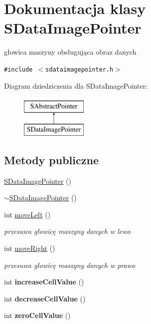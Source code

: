 \hypertarget{classSDataImagePointer}{
\section{Dokumentacja klasy SDataImagePointer}
\label{classSDataImagePointer}
}
głowica maszyny obsługująca obraz danych  


{\tt \#include $<$sdataimagepointer.h$>$}

Diagram dziedziczenia dla SDataImagePointer:\begin{figure}[H]
\begin{center}
\leavevmode
\includegraphics[height=2cm]{classSDataImagePointer}
\end{center}
\end{figure}
\subsection*{Metody publiczne}
\begin{CompactItemize}
\item 
\hyperlink{classSDataImagePointer_2ffb42e886f442004cd21617a6ea034d}{SDataImagePointer} ()
\item 
\hyperlink{classSDataImagePointer_8f96c4dc8dc25e0ff5cccb2e693ffcc8}{$\sim$SDataImagePointer} ()
\item 
int \hyperlink{classSDataImagePointer_87bb92d4bb0336b4723c64d03df9987c}{moveLeft} ()
\begin{CompactList}\small\item\em przesuwa głowicę maszyny danych w lewo \item\end{CompactList}\item 
int \hyperlink{classSDataImagePointer_9cc51881224c9e157e96d5e36189e54a}{moveRight} ()
\begin{CompactList}\small\item\em przesuwa głowicę maszyny danych w prawo \item\end{CompactList}\item 
\hypertarget{classSDataImagePointer_0cdd7239181d6f12bf6df551defaa769}{
int \textbf{increaseCellValue} ()}
\label{classSDataImagePointer_0cdd7239181d6f12bf6df551defaa769}

\item 
\hypertarget{classSDataImagePointer_0461b9855715a2d296e19865517f7f36}{
int \textbf{decreaseCellValue} ()}
\label{classSDataImagePointer_0461b9855715a2d296e19865517f7f36}

\item 
\hypertarget{classSDataImagePointer_ee071148492c43291fd01fd035f6398a}{
int \textbf{zeroCellValue} ()}
\label{classSDataImagePointer_ee071148492c43291fd01fd035f6398a}

\end{CompactItemize}


